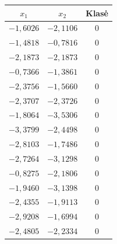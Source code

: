 \begin{minipage}{0.45\textwidth}
    \centering
    \begin{tabular}{|c|c|c|}
        \hline
        $x_1$ & $x_2$ & Klasė \\
        \hline
        $-1,6026$ & $-2,1106$ & 0 \\ \hline
        $-1,4818$ & $-0,7816$ & 0 \\ \hline
        $-2,1873$ & $-2,1873$ & 0 \\ \hline
        $-0,7366$ & $-1,3861$ & 0 \\ \hline
        $-2,3756$ & $-1,5660$ & 0 \\ \hline
        $-2,3707$ & $-2,3726$ & 0 \\ \hline
        $-1,8064$ & $-3,5306$ & 0 \\ \hline
        $-3,3799$ & $-2,4498$ & 0 \\ \hline
        $-2,8103$ & $-1,7486$ & 0 \\ \hline
        $-2,7264$ & $-3,1298$ & 0 \\ \hline
        $-0,8275$ & $-2,1806$ & 0 \\ \hline
        $-1,9460$ & $-3,1398$ & 0 \\ \hline
        $-2,4355$ & $-1,9113$ & 0 \\ \hline
        $-2,9208$ & $-1,6994$ & 0 \\ \hline
        $-2,4805$ & $-2,2334$ & 0 \\ \hline
    \end{tabular}
    \label{tab:klase0}
\end{minipage}